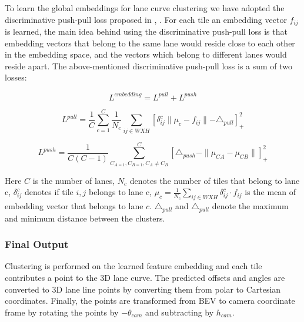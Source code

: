          To learn the global embeddings for lane curve clustering we have adopted the discriminative push-pull loss proposed in \cite{DBLP:journals/corr/abs-1802-05591} , \cite{DBLP:journals/corr/abs-1708-02551}. For each tile an embedding vector $f_{ij}$ is learned, the main idea behind using the discriminative push-pull loss is that embedding vectors that belong to the same lane would reside close to each other in the embedding space, and the vectors which belong to different lanes would reside apart. The above-mentioned discriminative push-pull loss is a sum of two losses:
            
            \begin{equation}
                L^{embedding} = L^{pull} + L^{push}
            \end{equation}
             
             \begin{equation}
                     L^{pull} = \frac{1}{C} \sum^{C}_{c=1}\frac{1}{N_{c}} \sum_{ij \in WXH}[ \delta_{ij}^{c} \parallel \mu_{c} - f_{ij}  \parallel - \triangle_{pull} ]_{+}^{2} 
             \end{equation}
             
             \begin{equation}
                 L^{push} =  \frac{1}{C(C -1)} \sum^{C}_{C_{A=1}, C_{B=1}, C_{A} \not =C_{B}}[ \triangle_{push} - \parallel \mu_{CA} - \mu_{CB}\parallel ]_{+}^{2}
             \end{equation}
            
            Here $C$ is the number of lanes, $N_{c}$ denotes the number of tiles that belong to lane c, $\delta_{ij}^{c}$ denotes if tile $i,j$ belongs to lane c, $\mu_{c} = \frac{1}{N_{c}} \sum_{ij \in WXH } \delta^{c}_{ij} \cdot f_{ij}$ is the mean of embedding vector that belongs to lane $c$. $\triangle_{pull}$ and $\triangle_{pull}$ denote the maximum and minimum distance between the clusters. 
            
        \subsubsection{Final Output}
        
        Clustering is performed on the learned feature embedding and each tile contributes a point to the 3D lane curve. The predicted offsets and angles are converted to 3D lane line points by converting them from polar to Cartesian coordinates. Finally, the points are transformed from BEV to camera coordinate frame by rotating the points by  $-\theta_{cam}$ and subtracting by $h_{cam}$. 
        
